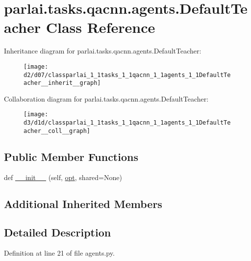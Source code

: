 \hypertarget{classparlai_1_1tasks_1_1qacnn_1_1agents_1_1DefaultTeacher}{}\section{parlai.\+tasks.\+qacnn.\+agents.\+Default\+Teacher Class Reference}
\label{classparlai_1_1tasks_1_1qacnn_1_1agents_1_1DefaultTeacher}


Inheritance diagram for parlai.\+tasks.\+qacnn.\+agents.\+Default\+Teacher\+:\nopagebreak
\begin{figure}[H]
\begin{center}
\leavevmode
\texttt{[image: d2/d07/classparlai\_1\_1tasks\_1\_1qacnn\_1\_1agents\_1\_1DefaultTeacher\_\_inherit\_\_graph]}
\end{center}
\end{figure}


Collaboration diagram for parlai.\+tasks.\+qacnn.\+agents.\+Default\+Teacher\+:\nopagebreak
\begin{figure}[H]
\begin{center}
\leavevmode
\texttt{[image: d3/d1d/classparlai\_1\_1tasks\_1\_1qacnn\_1\_1agents\_1\_1DefaultTeacher\_\_coll\_\_graph]}
\end{center}
\end{figure}
\subsection*{Public Member Functions}
\begin{DoxyCompactItemize}
\item 
def \hyperlink{classparlai_1_1tasks_1_1qacnn_1_1agents_1_1DefaultTeacher_a3b62aec4d32ee140251318598822f31c}{\+\_\+\+\_\+init\+\_\+\+\_\+} (self, \hyperlink{classparlai_1_1core_1_1teachers_1_1FbDialogTeacher_af7a9ec497b9cd0292d7b8fa220da7c28}{opt}, shared=None)
\end{DoxyCompactItemize}
\subsection*{Additional Inherited Members}


\subsection{Detailed Description}


Definition at line 21 of file agents.\+py.



